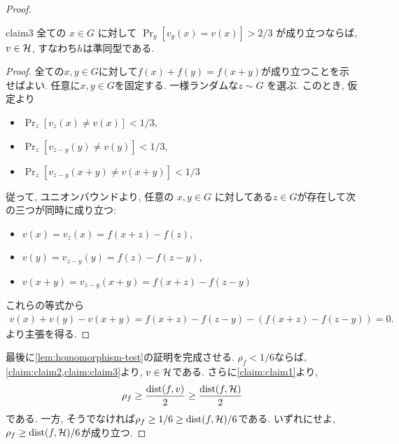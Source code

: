\begin{proof}
    \begin{claim}{}{claim3}
      全ての $x\in G$ に対して $\Pr_y[v_y(x)=v(x)]>2/3$ が成り立つならば, $v\in \mathcal{H}$, すなわち$h$は準同型である.
    \end{claim}
    \begin{proof}
      全ての$x,y\in G$に対して$f(x)+f(y)=f(x+y)$が成り立つことを示せばよい. 任意に$x,y\in G$を固定する.
      一様ランダムな$z\sim G$ を選ぶ. このとき, 仮定より
      \begin{itemize}
        \item $\Pr_z[v_z(x)\ne v(x)]<1/3$,
        \item $\Pr_z[v_{z-y}(y)\ne v(y)]<1/3$,
        \item $\Pr_z[v_{z-y}(x+y)\ne v(x+y)]<1/3$
      \end{itemize}
      従って, ユニオンバウンドより, 任意の $x,y\in G$ に対してある$z\in G$が存在して次の三つが同時に成り立つ:
      \begin{itemize}
        \item $v(x)=v_z(x)=f(x+z)-f(z)$,
        \item $v(y)=v_{z-y}(y)=f(z)-f(z-y)$,
        \item $v(x+y)=v_{z-y}(x+y)=f(x+z)-f(z-y)$
      \end{itemize}
      これらの等式から
      \begin{align*}
        v(x)+v(y)-v(x+y) = f(x+z)-f(z-y) - (f(x+z)-f(z-y)) = 0.
      \end{align*}
      より主張を得る.
    \end{proof}
    最後に\cref{lem:homomorphism-test}の証明を完成させる.
    $\rho_f<1/6$ならば, \cref{claim:claim2,claim:claim3}より, $v\in\mathcal{H}$である.
    さらに\cref{claim:claim1}より,
    \begin{align*}
      \rho_f \ge \frac{\mathrm{dist}(f,v)}{2} \ge \frac{\mathrm{dist}(f,\mathcal{H})}{2}
    \end{align*}
    である. 一方, そうでなければ$\rho_f\ge 1/6 \ge \mathrm{dist}(f,\mathcal{H})/6$である.
    いずれにせよ, $\rho_f\ge \mathrm{dist}(f,\mathcal{H})/6$が成り立つ.

  \end{proof}

